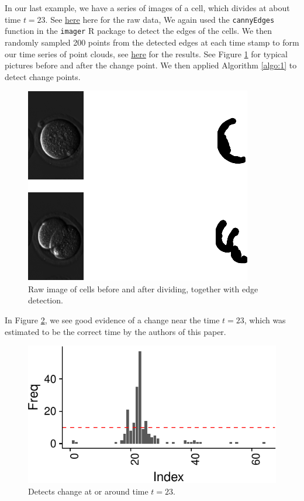 \documentclass[smallextended]{svjour3}       %
\begin{document}
\begin{example}
In our last example, we have a series of images of a cell, which divides at
about time \(t = 23\). See \href{http://stat.slu.edu/~speegle/cellsRaw.gif}{here} here for the raw data, We again used the
\texttt{cannyEdges} function in the \texttt{imager} R package to detect
the edges of the cells. We then randomly sampled 200 points from the
detected edges at each time stamp to form our time series of point
clouds, see \href{http://stat.slu.edu/~speegle/mycells2.gif}{here} for the results. See Figure \ref{fig:10} for typical pictures before and after the change point. We
then applied Algorithm \ref{algo:1} to detect change points.


\begin{figure}[H]\includegraphics{springer_template_files/figure-latex/chunk_10_5-1} 
\caption{Raw image of cells before and after dividing, together with edge detection.}
\label{fig:10}\end{figure}

In Figure \ref{fig:11}, we see good evidence of a change near the time $t = 23$, which was estimated to be the correct time by the authors of this paper. 

\begin{figure}[H]\includegraphics{springer_template_files/figure-latex/chunk_11-1} 
\caption{Detects change at or around time $t = 23$.}
\label{fig:11}\end{figure}


\end{example}
\end{document}
